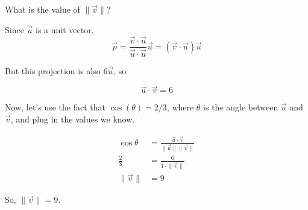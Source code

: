 \documentclass[11pt]{article}
\begin{document}
\begin{prob}
\begin{subprob}
\vspace{0.1in}

What is the value of $\lVert \vec v \rVert$? \\

    



\begin{solution}
Since $\vec u$ is a unit vector,
$$
\vec p
= \frac{\vec v \cdot \vec u}{\vec u \cdot \vec u} \vec u
= 
(\vec v \cdot \vec u)\vec u
$$

But this projection is also $6 \vec u$, so

$$\vec u \cdot \vec v = 6$$

Now, let's use the fact that $\cos(\theta) = 2/3$, where $\theta$ is the angle between $\vec u$ and $\vec v$, and plug in the values we know.

\begin{align*}
\cos \theta &= \frac{\vec u \cdot \vec v}{\lVert \vec u \rVert \lVert \vec v \rVert} \\
\frac{2}{3} &= \frac{6}{1 \cdot \lVert \vec v \rVert} \\
\lVert \vec v \rVert &= 9
\end{align*}

So, $\boxed{\lVert \vec v \rVert = 9}$.

\end{solution}

\end{subprob}

\end{prob}
\end{document}
